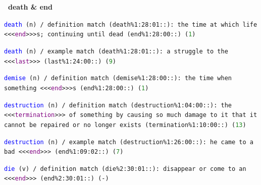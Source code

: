 \documentclass[12pt,a4paper]{article}
\begin{document}
{\vspace{1em}

\noindent\textbf{\textbullet\ death \& end}



\texttt{\textcolor{blue}{death} (n) / definition match (death\%1:28:01::): the time at which life <<<\textcolor{purple}{end}>>>s; continuing until dead (end\%1:28:00::) (\textcolor{ForestGreen}{1}) }



\texttt{\textcolor{blue}{death} (n) / example match (death\%1:28:01::): a struggle to the <<<\textcolor{purple}{last}>>> (last\%1:24:00::) (\textcolor{ForestGreen}{9})}

\clearpage  %


\texttt{\textcolor{blue}{demise} (n) / definition match (demise\%1:28:00::): the time when something <<<\textcolor{purple}{end}>>>s (end\%1:28:00::) (\textcolor{ForestGreen}{1})}

\texttt{\textcolor{blue}{destruction} (n) / definition match (destruction\%1:04:00::): the <<<\textcolor{purple}{termination}>>> of something by causing so much damage to it that it cannot be repaired or no longer exists (termination\%1:10:00::) (\textcolor{ForestGreen}{13})}


\texttt{\textcolor{blue}{destruction} (n) / example match (destruction\%1:26:00::): he came to a bad <<<\textcolor{purple}{end}>>> (end\%1:09:02::)  (\textcolor{ForestGreen}{7})}


\texttt{\textcolor{blue}{die} (v) / definition match (die\%2:30:01::): disappear or come to an <<<\textcolor{purple}{end}>>> (end\%2:30:01::) (-)}

}
\end{document}
